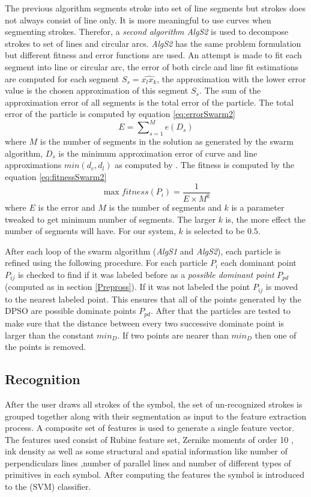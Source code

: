\documentclass{article}
\begin{document}
The previous algorithm segments stroke into set of line segments but strokes does not always consist of line only. It is more meaningful to use curves when segmenting strokes. Therefor, a \textit{second algorithm \textsl{AlgS2}} is used to decompose strokes to set of lines and circular arcs. \textit{\textsl{AlgS2}} has the same problem formulation but different fitness and error functions are used. An attempt is made to fit each segment into line or circular arc, the error of both circle and line fit estimations are computed for each segment $S_s=\widehat{x_lx_k}$, the approximation with the lower error value is the chosen approximation of this segment $S_s$\cite{CruveDivisionSwarm}. The sum of the approximation error of all segments is the total error of the particle. The total error of the particle is computed by equation \ref{eq:errorSwarm2}
\small \begin{equation}
E=\sum\nolimits_{s = 1}^M e(D_s) 
\label{eq:errorSwarm2}
\end{equation} \normalsize where $M$ is the number of segments in the solution as generated by the swarm algorithm, $D_s$ is the minimum approximation error of curve and line approximations $min(d_c,d_l)$ as computed by \cite{CruveDivisionSwarm}.  The fitness is computed by the equation \ref{eq:fitnessSwarm2} \small \begin{equation}
\max fitness(P_i ) = \frac{1}{{E \times M^k }}
\label{eq:fitnessSwarm2}
\end{equation} \normalsize where $E$ is the error and $M$ is the number of segments and $k$ is a parameter tweaked to get minimum number of segments. The larger $k$ is, the more effect the number of segments will have. For our system, $k$ is selected to be $0.5$\cite{CruveDivisionSwarm}.

After each loop of the swarm algorithm (\textsl{AlgS1} and \textsl{AlgS2}), each particle is refined using the following procedure. For each particle $P_i$ each dominant point $P_{ij}$ is checked to find if it was labeled before as a \textit{possible dominant point} $P_{pd}$ (computed as in section \ref{Prepross}). If it was not labeled the point $P_{ij}$ is moved to the nearest labeled point. This ensures that all of the points generated by the DPSO are possible dominate points $P_{pd}$. After that the particles are tested to make sure that the distance between every two successive dominate point is larger than the constant $min_D$. If two points are nearer than $min_D$ then one of the points is removed. 
\subsection{Recognition}
\label{sec:Recognition}
After the user draws all strokes of the symbol, the set of un-recognized strokes is grouped together along with their segmentation as input to the feature extraction process. A composite set of features is used to generate a single feature vector. The features used consist of Rubine feature set,  Zernike moments of order 10 \cite{HeloiseBeautification}, ink density as well as some structural and spatial information like number of perpendiculars lines ,number of parallel lines and number of different types of primitives in each symbol. After computing the features the symbol is introduced to the (SVM) classifier. 
\end{document}
